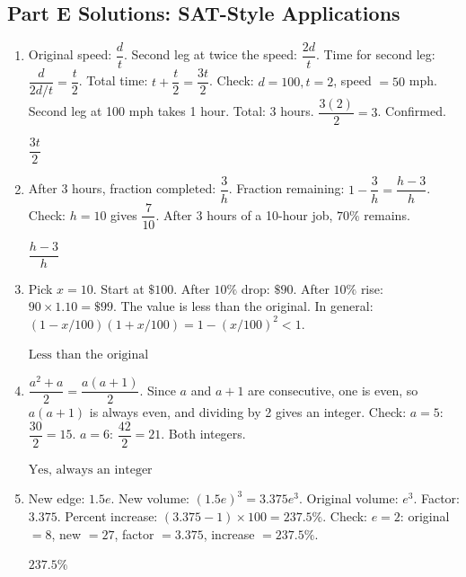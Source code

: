 \documentclass[14pt]{extarticle}
\begin{document}
\subsection*{Part E Solutions: SAT-Style Applications}
\begin{enumerate}
  \item Original speed: \(\dfrac{d}{t}\). Second leg at twice the speed: \(\dfrac{2d}{t}\). Time for second leg: \(\dfrac{d}{2d/t} = \dfrac{t}{2}\). Total time: \(t + \dfrac{t}{2} = \dfrac{3t}{2}\). Check: \(d = 100, t = 2\), speed \(= 50\) mph. Second leg at 100 mph takes 1 hour. Total: 3 hours. \(\dfrac{3(2)}{2} = 3\). Confirmed.

  \(\boxed{\dfrac{3t}{2}}\)

  \item After 3 hours, fraction completed: \(\dfrac{3}{h}\). Fraction remaining: \(1 - \dfrac{3}{h} = \dfrac{h - 3}{h}\). Check: \(h = 10\) gives \(\dfrac{7}{10}\). After 3 hours of a 10-hour job, \(70\%\) remains.

  \(\boxed{\dfrac{h - 3}{h}}\)

  \item Pick \(x = 10\). Start at \(\$100\). After \(10\%\) drop: \(\$90\). After \(10\%\) rise: \(90 \times 1.10 = \$99\). The value is less than the original. In general: \((1 - x/100)(1 + x/100) = 1 - (x/100)^2 < 1\).

  \(\boxed{\text{Less than the original}}\)

  \item \(\dfrac{a^2 + a}{2} = \dfrac{a(a+1)}{2}\). Since \(a\) and \(a + 1\) are consecutive, one is even, so \(a(a+1)\) is always even, and dividing by 2 gives an integer. Check: \(a = 5\): \(\dfrac{30}{2} = 15\). \(a = 6\): \(\dfrac{42}{2} = 21\). Both integers.

  \(\boxed{\text{Yes, always an integer}}\)

  \item New edge: \(1.5e\). New volume: \((1.5e)^3 = 3.375e^3\). Original volume: \(e^3\). Factor: \(3.375\). Percent increase: \((3.375 - 1) \times 100 = 237.5\%\). Check: \(e = 2\): original \(= 8\), new \(= 27\), factor \(= 3.375\), increase \(= 237.5\%\).

  \(\boxed{237.5\%}\)
\end{enumerate}

\end{document}
